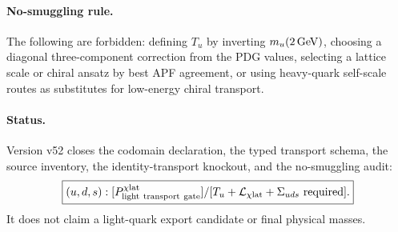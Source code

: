 \paragraph{No-smuggling rule.}
The following are forbidden: defining $T_u$ by inverting $m_u(2\,{\rm GeV})$,
choosing a diagonal three-component correction from the PDG values, selecting a
lattice scale or chiral ansatz by best APF agreement, or using heavy-quark
self-scale routes as substitutes for low-energy chiral transport.

\paragraph{Status.}
Version v52 closes the codomain declaration, the typed transport schema, the
source inventory, the identity-transport knockout, and the no-smuggling audit:
\[
\boxed{
(u,d,s):[P_{\rm light\ transport\ gate}^{\chi{\rm lat}}]
/[T_u+\mathcal L_{\chi{\rm lat}}+\Sigma_{uds}\ {\rm required}].
}
\]
It does not claim a light-quark export candidate or final physical masses.
